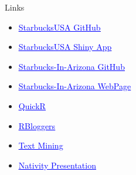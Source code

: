 \documentclass{beamer}
\begin{document}
\begin{frame}{
	\begin{minipage}[t]{0.75\textwidth}
		Links
	\end{minipage}
	\hfill
	\begin{minipage}[t]{0.25\textwidth}
		\flushright
	\end{minipage}
}{}
\begin{itemize}
	\item \href{https://github.com/gseamans/starbucksUsa}{\textcolor{blue}{\underline{StarbucksUSA GitHub}}}
	\item \href{https://gseamans.shinyapps.io/starbucksusa/}{\textcolor{blue}{\underline{StarbucksUSA Shiny App}}}
	\item \href{https://github.com/gseamans/Starbucks-In-Arizona}{\textcolor{blue}{\underline{Starbucks-In-Arizona GitHub}}}
	\item \href{https://gseamans.github.io/Starbucks-In-Arizona/}{\textcolor{blue}{\underline{Starbucks-In-Arizona WebPage}}}
	\item \href{https://www.statmethods.net/}{\textcolor{blue}{\underline{QuickR}}}
	\item \href{https://www.r-bloggers.com/}{\textcolor{blue}{\underline{RBloggers}}}
	\item \href{http://rpubs.com/grs/361282}{\textcolor{blue}{\underline{Text Mining}}}
	\item \href{https://gseamans.github.io/Nativity_1850_1990/NativityCensus.html\#1}{\textcolor{blue}{\underline{Nativity Presentation}}}
	
\end{itemize}

\end{frame}
\end{document}
